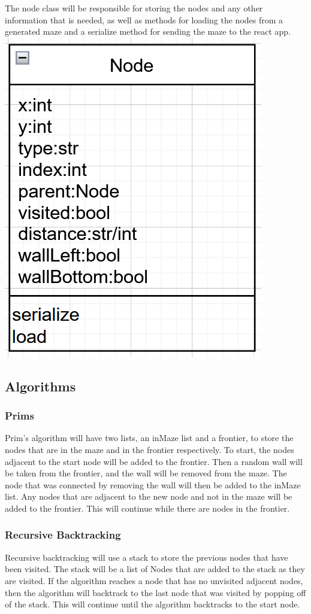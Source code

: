 \documentclass[titlepage]{article}
\begin{document}
The node class will be responsible for storing the nodes and any other information that is needed, as well as methods for loading the nodes from a generated maze and a serialize method for sending the maze to the react app.
\newline
\includegraphics[width=0.5\linewidth]{assets/class diagrams/node.PNG}

\subsection{Algorithms}
\subsubsection{Prims}
Prim's algorithm will have two lists, an inMaze list and a frontier, to store the nodes that are in the maze and in the frontier respectively. To start, the nodes adjacent to the start node will be added to the frontier. Then a random wall will be taken from the frontier, and the wall will be removed from the maze. The node that was connected by removing the wall will then be added to the inMaze list. Any nodes that are adjacent to the new node and not in the maze will be added to the frontier. This will continue while there are nodes in the frontier.

\subsubsection{Recursive Backtracking}
Recursive backtracking will use a stack to store the previous nodes that have been visited. The stack will be a list of Nodes that are added to the stack as they are visited. If the algorithm reaches a node that has no unvisited adjacent nodes, then the algorithm will backtrack to the last node that was visited by popping off of the stack. This will continue until the algorithm backtracks to the start node.
\end{document}

